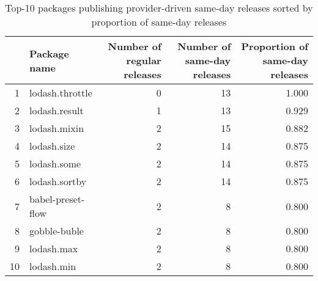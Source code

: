 \begin{table}[ht]
\centering
\begin{tabular}{rlrrr}
  \hline
 & \pbox{20cm}{Package \\name} & \pbox{20cm}{Number of \\regular releases} & \pbox{20cm}{Number of \\same-day releases} & \pbox{20cm}{Proportion of \\same-day releases} \\ 
  \hline
1 & lodash.throttle & 0 & 13 & 1.000 \\ 
  2 & lodash.result & 1 & 13 & 0.929 \\ 
  3 & lodash.mixin & 2 & 15 & 0.882 \\ 
  4 & lodash.size & 2 & 14 & 0.875 \\ 
  5 & lodash.some & 2 & 14 & 0.875 \\ 
  6 & lodash.sortby & 2 & 14 & 0.875 \\ 
  7 & babel-preset-flow & 2 & 8 & 0.800 \\ 
  8 & gobble-buble & 2 & 8 & 0.800 \\ 
  9 & lodash.max & 2 & 8 & 0.800 \\ 
  10 & lodash.min & 2 & 8 & 0.800 \\ 
   \hline
\end{tabular}
\caption{Top-10 packages publishing provider-driven same-day releases sorted by proportion of same-day releases} 
\end{table}
